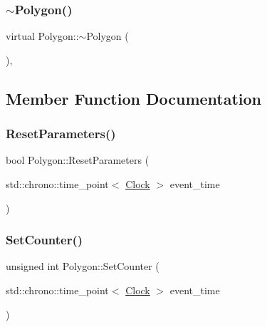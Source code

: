 \mbox{\label{classPolygon_a873f9acee059f717277b6414102dab16}} 
\subsubsection{\texorpdfstring{$\sim$\+Polygon()}{~Polygon()}}
{\footnotesize\ttfamily virtual Polygon\+::$\sim$\+Polygon (\begin{DoxyParamCaption}{ }\end{DoxyParamCaption})\hspace{0.3cm}{\ttfamily [inline]}, {\ttfamily [virtual]}}



\subsection{Member Function Documentation}
\mbox{\label{classPolygon_a0e2824d12cd6b18c8b14c64ef4b2bf97}} 
\subsubsection{\texorpdfstring{Reset\+Parameters()}{ResetParameters()}}
{\footnotesize\ttfamily bool Polygon\+::\+Reset\+Parameters (\begin{DoxyParamCaption}\item[{std\+::chrono\+::time\+\_\+point$<$ \mbox{\hyperlink{universe_8h_a0ef8d951d1ca5ab3cfaf7ab4c7a6fd80}{Clock}} $>$}]{event\+\_\+time }\end{DoxyParamCaption})}

\mbox{\label{classPolygon_a344626b07ee8dc40c71c3bec1480d2c2}} 
\subsubsection{\texorpdfstring{Set\+Counter()}{SetCounter()}\hspace{0.1cm}{\footnotesize\ttfamily [1/2]}}
{\footnotesize\ttfamily unsigned int Polygon\+::\+Set\+Counter (\begin{DoxyParamCaption}\item[{std\+::chrono\+::time\+\_\+point$<$ \mbox{\hyperlink{universe_8h_a0ef8d951d1ca5ab3cfaf7ab4c7a6fd80}{Clock}} $>$}]{event\+\_\+time }\end{DoxyParamCaption})\hspace{0.3cm}{\ttfamily [inline]}}


